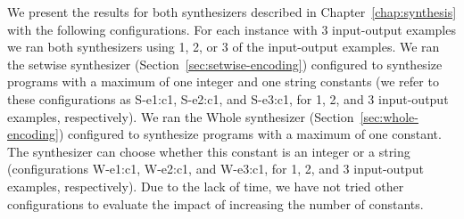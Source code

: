 We present the results for both synthesizers described in
Chapter~\ref{chap:synthesis} with the following configurations.
For each instance with 3 input-output examples we ran both synthesizers using 1,
2, or 3 of the input-output examples.
We ran the setwise synthesizer (Section~\ref{sec:setwise-encoding}) configured
to synthesize programs with a maximum of one integer and one string constants
(we refer to these configurations as S-e1:c1, S-e2:c1, and S-e3:c1, for 1, 2,
and 3 input-output examples, respectively).
We ran the Whole synthesizer (Section~\ref{sec:whole-encoding}) configured to
synthesize programs with a maximum of one constant. The synthesizer can
choose whether this constant is an integer or a string (configurations W-e1:c1,
W-e2:c1, and W-e3:c1, for 1, 2, and 3 input-output examples, respectively).
Due to the lack of time, we have not tried other configurations to evaluate the
impact of increasing the number of constants.

